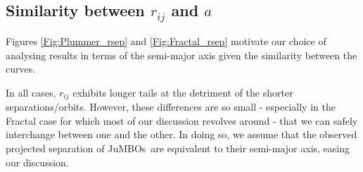 \documentclass[aa]{lib/aa}
\newcommand{\jumbos}{\mbox{JuMBOs}}
\begin{document}
\begin{appendix}
    \section{Similarity between $r_{ij}$ and $a$}
    Figures \ref{Fig:Plummer_rsep} and \ref{Fig:Fractal_rsep} motivate our choice of analysing results in terms of the semi-major axis given the similarity between the curves. 
    
    In all cases, $r_{ij}$ exhibits longer tails at the detriment of the shorter separations/orbits. However, these differences are so small - especially in the Fractal case for which most of our discussion revolves around - that we can safely interchange between one and the other. In doing so, we assume that the observed projected separation of \jumbos\, are equivalent to their semi-major axis, easing our discussion.
    

\end{appendix}
\end{document}
